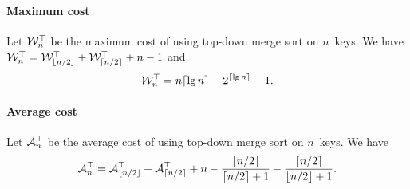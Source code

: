 \paragraph{Maximum cost}

Let \(\mathcal{W}_{n}^{\top}\) be the maximum cost of using top-down merge
sort on \(n\)~keys. We have \(\mathcal{W}_{n}^{\top} = \mathcal{W}_{\lfloor{n/2}\rfloor}^{\top} +
\mathcal{W}_{\lceil{n/2}\rceil}^{\top} + n - 1\) and
\begin{equation}
\mathcal{W}_{n}^{\top} = n\lceil{\lg n}\rceil - 2^{\lceil{\lg n}\rceil} + 1.
\label{eq:Wtop}
\end{equation}

\paragraph{Average cost}

Let \(\mathcal{A}_{n}^{\top}\) be the average cost of using top-down merge
sort on \(n\)~keys. We have
\begin{equation}
\mathcal{A}_{n}^{\top} = \mathcal{A}_{\lfloor{n/2}\rfloor}^{\top} +
\mathcal{A}_{\lceil{n/2}\rceil}^{\top} + n -
\frac{\lfloor{n/2}\rfloor}{\lceil{n/2}\rceil+1} 
- \frac{\lceil{n/2}\rceil}{\lfloor{n/2}\rfloor+1}.
\label{eq:Mtop}
\end{equation}
